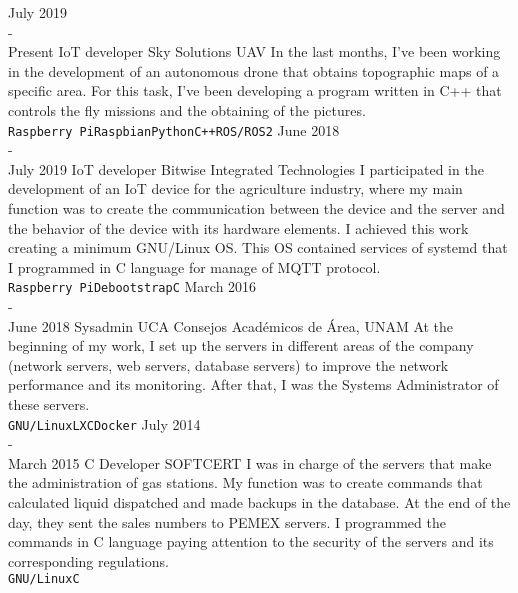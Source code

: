 \documentclass[9pt]{developercv} %
\begin{document}
\begin{entrylist}
	\entry
		{July 2019\\-\\Present}
		{IoT developer}
		{Sky Solutions UAV}
		{In the last months, I've been working in the development of an autonomous drone that obtains topographic maps of a specific area. For this task, I've been developing a program written in C++ that controls the fly missions and the obtaining of the pictures.\\ \texttt{Raspberry Pi}\slashsep\texttt{Raspbian}\slashsep\texttt{Python}\slashsep\texttt{C++}\slashsep\texttt{ROS/ROS2}}
	\entry
		{June 2018\\-\\July 2019}
		{IoT developer}
		{Bitwise Integrated Technologies}
		{I participated in the development of an IoT device for the agriculture industry, where my main function was to create the communication between the device and the server and the behavior of the device with its hardware elements. I achieved this work creating a minimum GNU/Linux OS. This OS contained services of systemd that I programmed in C language for manage of MQTT protocol.\\ \texttt{Raspberry Pi}\slashsep\texttt{Debootstrap}\slashsep\texttt{C}}
	\entry
		{March 2016\\-\\June 2018}
		{Sysadmin}
		{UCA Consejos Académicos de Área, UNAM}
		{At the beginning of my work, I set up the servers in different areas of the company (network servers, web servers, database servers) to improve the network performance and its monitoring. After that, I was the Systems Administrator of these servers.\\ \texttt{GNU/Linux}\slashsep\texttt{LXC}\slashsep\texttt{Docker}}
	\entry
		{July 2014\\-\\March 2015}
		{C Developer}
		{SOFTCERT}
		{I was in charge of the servers that make the administration of gas stations. My function was to create commands that calculated liquid dispatched and made backups in the database. At the end of the day, they sent the sales numbers to PEMEX servers. I programmed the commands in C language paying attention to the security of the servers and its corresponding regulations.\\ \texttt{GNU/Linux}\slashsep\texttt{C}}

\end{entrylist}
\end{document}
